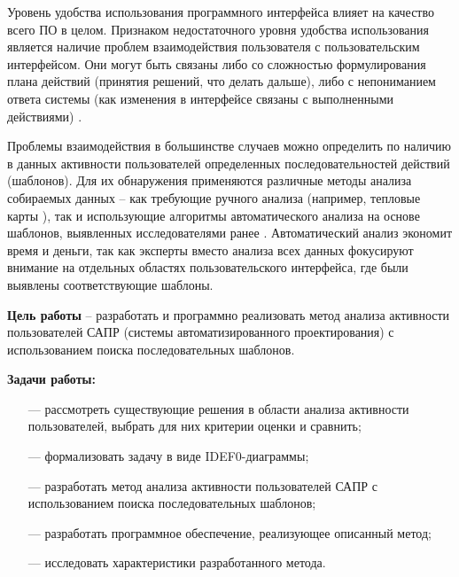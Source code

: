 
Уровень удобства использования программного интерфейса влияет на качество всего ПО в целом. Признаком недостаточного уровня удобства использования является наличие проблем взаимодействия пользователя с пользовательским интерфейсом. Они могут быть связаны либо со сложностью формулирования плана действий (принятия решений, что делать дальше), либо с непониманием ответа системы (как изменения в интерфейсе связаны с выполненными действиями) \cite{1}.

Проблемы взаимодействия в большинстве случаев можно определить по наличию в данных активности пользователей определенных последовательностей действий (шаблонов). Для их обнаружения применяются различные методы анализа собираемых данных – как требующие ручного анализа (например, тепловые карты \cite{2,3}), так и использующие алгоритмы автоматического анализа \cite{1} на основе шаблонов, выявленных исследователями ранее \cite{4, 5, 6}. Автоматический анализ экономит время и деньги, так как эксперты вместо анализа всех данных фокусируют внимание на отдельных областях пользовательского интерфейса,
где были выявлены соответствующие шаблоны.

\textbf{Цель работы} – разработать и программно реализовать метод анализа активности пользователей САПР (системы автоматизированного проектирования) с использованием поиска последовательных шаблонов.

\textbf{Задачи работы:}
\begin{itemize}
	\item[---] рассмотреть существующие решения в области анализа активности пользователей, выбрать для них критерии оценки и сравнить;
	\item[---] формализовать задачу в виде IDEF0-диаграммы;
	\item[---] разработать метод анализа активности пользователей САПР с использованием поиска последовательных шаблонов; %
	\item[---] разработать программное обеспечение, реализующее описанный метод;
	\item[---] исследовать характеристики разработанного метода.
\end{itemize}
